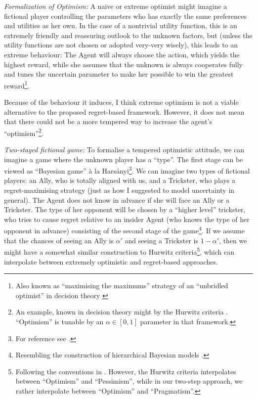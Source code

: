 \documentclass{article}
\begin{document}
{\it Formalization of Optimism:}
A naive or extreme optimist might imagine a fictional player controlling the parameters who has exactly the same preferences and utilities as her own.
In the case of a nontrivial utility function, this is an extremely friendly and reassuring outlook to the unknown factors, but (unless the utility functions are not chosen or adopted very-very wisely), this leads to an extreme behaviour: The Agent will always choose the action, which yields the highest reward, while she assumes that the unknown is always cooperates fully and tunes the uncertain parameter to make her possible to win the greatest reward\footnote{Also known as ``maximising the maximums'' strategy of an ``unbridled optimist'' in decision theory \cite{book:ResnikDecisionTheory}}.

Because of the behaviour it induces, I think extreme optimism is not a viable alternative to the proposed regret-based framework. However, it does not mean that there could not be a more tempered way to increase the agent's ``optimism''\footnote{An example, known in decision theory might by the Hurwitz criteria \cite{paper:Milnor,web:HurwiczCriterion}. ``Optimism'' is tunable by an $\alpha \in [0,1]$ parameter in that framework.}.

{\it Two-staged fictional game:}
To formalise a tempered optimistic attitude, we can imagine a game where the unknown player has a ``type''. The first stage can be viewed as ``Bayesian game'' à la Harsányi\footnote{For reference see \cite{paper:Harsanyi_I,paper:Harsanyi_II,paper:Harsanyi_III,paper:ZamirBayesianGames}.}. We can imagine two types of fictional players: an Ally, who is totally aligned with us, and a Trickster, who plays a regret-maximising strategy (just as how I suggested to model uncertainty in general).
The Agent does not know in advance if she will face an Ally or a Trickster. The type of her opponent will be chosen by a ``higher level'' trickster, who tries to cause regret relative to an insider Agent (who knows the type of her opponent in advance) consisting of the second stage of the game\footnote{Resembling the construction of hierarchical Bayesian models \cite{book:BayesianDataAnalysis}.}.
If we assume that the chances of seeing an Ally is $\alpha'$ and seeing a Trickster is $1-\alpha'$, then we might have a somewhat similar construction to Hurwitz criteria\footnote{Following the conventions in \cite{paper:Milnor}. However, the Hurwitz criteria interpolates between ``Optimism'' and ``Pessimism'', while in our two-step approach, we rather interpolate between ``Optimism'' and ``Pragmatism''.}, which can interpolate between extremely optimistic and regret-based approaches.
\end{document}
